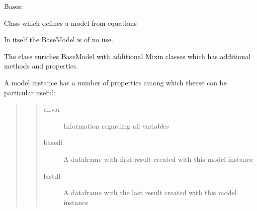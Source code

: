 \documentclass[letterpaper,10pt,english]{sphinxmanual}
\begin{document}

\begin{fulllineitems}
\label{\detokenize{core/modelclass:modelclass.BaseModel}}
\pysigstartsignatures
{}
\pysigstopsignatures
\sphinxAtStartPar
Bases: 

\sphinxAtStartPar
Class which defines a model from equations

\sphinxAtStartPar
In itself the BaseModel is of no use.

\sphinxAtStartPar
The  class enriches BaseModel with additional
Mixin classes which has additional methods and properties.

\sphinxAtStartPar
A model instance has a number of properties among which theese can be particular useful:
\begin{quote}
\begin{quote}\begin{description}
\item[{allvar}] \leavevmode
\sphinxAtStartPar
Information regarding all variables

\item[{basedf}] \leavevmode
\sphinxAtStartPar
A dataframe with first result created with this model instance

\item[{lastdf}] \leavevmode
\sphinxAtStartPar
A dataframe with the last result created with this model instance


\end{description}
\end{quote}
\end{quote}
\end{fulllineitems}
\end{document}
